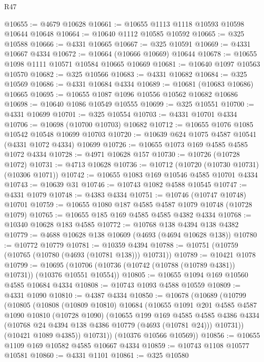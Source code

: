 \begin{lexlean}{R47}
\begin{coremodule}
@10655 := @4679 @10628
@10661 := @10655 @1113 @1118 @10593 @10598 @10644 @10648
@10664 := @10640 @1112 @10585 @10592
@10665 := @325 @10588
@10666 := @4331 @10665
@10667 := @325 @10591
@10669 := @4331 @10667 @4334
@10672 := @10664 (@10666 @10669) @10644
@10678 := @10655 @1098 @1111 @10571 @10584 @10665 @10669
@10681 := @10640 @1097 @10563 @10570
@10682 := @325 @10566
@10683 := @4331 @10682
@10684 := @325 @10569
@10686 := @4331 @10684 @4334
@10689 := @10681 (@10683 @10686) @10665
@10695 := @10655 @1087 @1096 @10556 @10562 @10682 @10686
@10698 := @10640 @1086 @10549 @10555
@10699 := @325 @10551
@10700 := @4331 @10699
@10701 := @325 @10554
@10703 := @4331 @10701 @4334
@10706 := @10698 (@10700 @10703) @10682
@10712 := @10655 @1076 @1085 @10542 @10548 @10699 @10703
@10720 := @10639 @624 @1075 @4587 @10541 (@4331 @1072 @4334) @10699
@10726 := @10655 @1073 @169 @4585 @4585 @1072 @4334
@10728 := @4971 @10628 @157
@10730 := @10726 (@10728 @1072)
@10731 := @4713 @10628
@10736 := @10712 (@10720 (@10730 @10731) (@10306 @1071))
@10742 := @10655 @1083 @169 @10546 @4585 @10701 @4334
@10743 := @10639 @31
@10746 := @10743 @1082 @4588 @10545
@10747 := @4331 @1079
@10748 := @4383 @4334
@10751 := @10746 (@10747 @10748) @10701
@10759 := @10655 @1080 @187 @4585 @4587 @1079 @10748 (@10728 @1079)
@10765 := @10655 @185 @169 @4585 @4585 @4382 @4334
@10768 := @10340 @10628 @183 @4585
@10772 := @10768 @138 @4394 @138 @4382
@10779 := @4688 @10628 @138 @10609 (@4693 (@4694 @10628 @138))
@10780 := @10772 @10779
@10781 := @10359 @4394
@10788 := @10751 (@10759 (@10765 (@10780 (@4693 (@10781 @138))) @10731))
@10789 := @10421 @1078
@10799 := @10695 (@10706 (@10736 (@10742 (@10788 (@10789 @4381)) @10731)) (@10376 @10551 @10554))
@10805 := @10655 @1094 @169 @10560 @4585 @10684 @4334
@10808 := @10743 @1093 @4588 @10559
@10809 := @4331 @1090
@10810 := @4387 @4334
@10850 := @10678
    (@10689
      (@10799
        (@10805
          (@10808
            (@10809 @10810)
            @10684
            (@10655
              @1091
              @201
              @4585
              @4587
              @1090
              @10810
              (@10728 @1090)
              (@10655
                @199
                @169
                @4585
                @4585
                @4386
                @4334
                (@10768 @24 @4394 @138 @4386 @10779 (@4693 (@10781 @24)))
                @10731))
            (@10421 @1089 @4385))
          @10731))
      (@10376 @10566 @10569))
@10856 := @10655 @1109 @169 @10582 @4585 @10667 @4334
@10859 := @10743 @1108 @10577 @10581
@10860 := @4331 @1101
@10861 := @325 @10580

\end{coremodule}
\end{lexlean}
